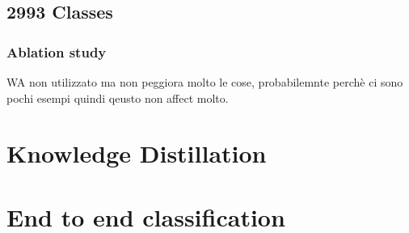 \subsection{2993 Classes}
\subsubsection{Ablation study}
WA non utilizzato ma non peggiora molto le cose, probabilemnte perchè ci sono pochi esempi quindi qeusto non affect molto.

\section{Knowledge Distillation}
\label{sec:exp-kd}
\section{End to end classification}
\label{sec:exp-end2end}

